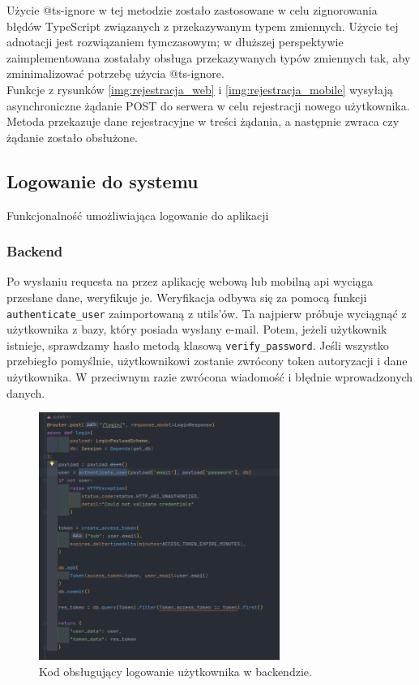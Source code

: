 Użycie @ts-ignore w tej metodzie zostało zastosowane w celu zignorowania błędów TypeScript związanych z przekazywanym typem zmiennych. Użycie tej adnotacji jest rozwiązaniem tymczasowym; w dłuższej perspektywie zaimplementowana zostałaby obsługa przekazywanych typów zmiennych tak, aby zminimalizować potrzebę użycia @ts-ignore.\\
Funkcje z rysunków \ref{img:rejestracja_web} i \ref{img:rejestracja_mobile} wysyłają asynchroniczne żądanie POST do serwera w celu rejestracji nowego użytkownika. Metoda przekazuje dane rejestracyjne w treści żądania, a następnie zwraca czy żądanie zostało obsłużone.

\subsection{Logowanie do systemu}
Funkcjonalność umożliwiająca logowanie do aplikacji

\subsubsection{Backend}
Po wysłaniu requesta na przez aplikację webową lub mobilną api wyciąga przesłane dane, weryfikuje je.
Weryfikacja odbywa się za pomocą funkcji \texttt{authenticate\_user} zaimportowaną z utils’ów.
Ta najpierw próbuje wyciągnąć z użytkownika z bazy, który posiada wysłany e-mail. Potem, jeżeli użytkownik istnieje, sprawdzamy hasło metodą klasową \texttt{verify\_password}. Jeśli wszystko przebiegło pomyślnie, użytkownikowi zostanie zwrócony token autoryzacji i dane użytkownika. W przeciwnym razie zwrócona wiadomość i błędnie wprowadzonych danych.

\begin{figure}[H]
    \centering
    \includegraphics[width=0.7\textwidth]{chapters/chapter_8/screens/logowanie_backend}
    \caption{Kod obsługujący logowanie użytkownika w backendzie.}
    \label{img:logowanie_backend}
\end{figure}

